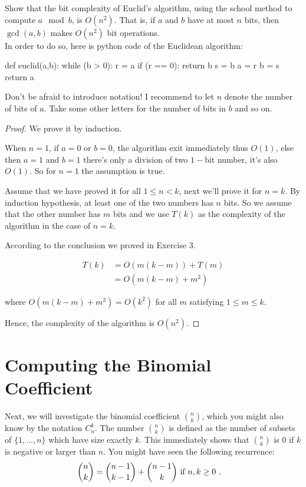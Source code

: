 \documentclass[11pt,a4paper,oneside]{article}
\begin{document}
\begin{problem}{2}
\statement
Show that the bit complexity of Euclid's algorithm, using the school method
to compute $a \mod b$, is $O(n^2)$. That is,
if $a$ and $b$ have at most $n$ bits, then $\gcd(a,b)$ makes $O(n^2)$ bit operations.\\

In order to do so, here is python code of the Euclidean algorithm:
\begin{python}
def euclid(a,b):
	while (b > 0):
		r = a %
		if (r == 0):
			return b
		s = b %
		a = r
		b = s
  	return a
\end{python}
Don't be afraid to introduce notation! I recommend to let $n$ denote the number of bits of $a$.
Take some other letters for the number of bits in $b$ and so on.
\solution
\begin{proof}
	
We prove it by induction.

When \(n = 1\), if $a = 0$ or $b = 0$, the algorithm exit immediately thus $O(1)$, else then $a = 1$ and $b = 1$ there's only a division of two $1-$bit number, it's also $O(1)$. So for $n = 1$ the assumption is true.

Assume that we have proved it for all \(1 \leq n < k \), next we'll prove it for \( n=k\). By induction hypothesis, at least one of the two numbers has \(n \) bits. So we assume that the other number has \(m \) bits and we use \(T(k)\) as the complexity of the algorithm in the case of \(n=k\).

According to the conclusion we proved in Exercise 3.

\[
	\begin{split}
		T(k) &= O(m(k - m)) + T(m) \\
		&= O(m(k-m) + m^2)
	\end{split}
\]

where \( O(m(k - m) + m^2) = O(k^2)\) for all \(m\) satisfying \(1 \leq m \leq k\).

Hence, the complexity of the algorithm is \(O(n^2)\).

\end{proof}
\end{problem}

\section*{Computing the Binomial Coefficient}

    Next, we will investigate the binomial coefficient ${n \choose k}$, which 
    you might also know by the notation $C^k_n$. The number ${n \choose k}$ is defined
    as the number of subsets of $\{1,\dots,n\}$ which have size exactly $k$. 
    This immediately shows that ${n \choose k}$ is $0$ if $k$ is negative or larger than $n$.
    You might have seen the following recurrence:
    \begin{align*}
     {n \choose k} & = {n-1 \choose k-1} + {n-1 \choose k} \textnormal{ if } n,k \geq 0 \ .
    \end{align*}
\end{document}
